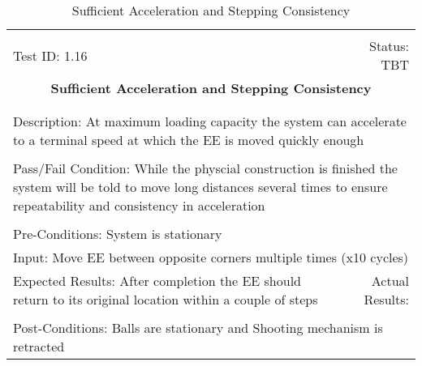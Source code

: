 \documentclass[titlepage]{article}
\begin{document}
\begin{center}%
\begin{table}[h!]
\begin{tabular}{|l r|}\hline&\\[-2mm]
	Test ID: 1.16	&Status: TBT\\[-3mm]
	\multicolumn{2}{|c|}{\textbf{\large{Sufficient Acceleration and Stepping Consistency}}}\\&\\\hline&\\[-3mm]
	\multicolumn{2}{|p{\textwidth}|}{Description: At maximum loading capacity the system can accelerate to a terminal speed at which the EE is moved quickly enough}\\[1mm]\hline&\\[-3mm]
	\multicolumn{2}{|p{\textwidth}|}{Pass/Fail Condition: While the physcial construction is finished the system will be told to move long distances several times to ensure repeatability and consistency in acceleration}\\[1mm]\hline&\\[-3mm]
	\multicolumn{2}{|p{\textwidth}|}{Pre-Conditions: System is stationary}\\[4mm]
	\multicolumn{2}{|p{\textwidth}|}{Input: Move EE between opposite corners multiple times (x10 cycles)}\\[2mm]\hline
	\multicolumn{1}{|p{0.49\textwidth}}{Expected Results: After completion the EE should return to its original location within a couple of steps}	&\multicolumn{1}{|p{0.45\textwidth}|}{Actual Results:}\\\hline&\\[-3mm]
	\multicolumn{2}{|p{\textwidth}|}{Post-Conditions: Balls are stationary and Shooting mechanism is retracted}\\\hline
\end{tabular}
\caption{Sufficient Acceleration and Stepping Consistency}
\end{table}
\end{center}
\newpage
\end{document}
